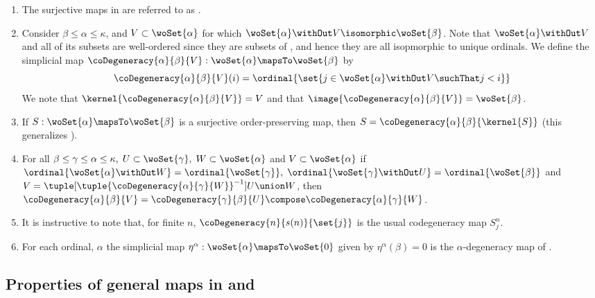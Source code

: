 \begin{enumerate}
\item The surjective maps in \DeltaC{}{} are referred to as .

\item Consider $\beta \leq \alpha \leq \kappa$, and $V \subset \woSet{\alpha}$ for which
$\woSet{\alpha} \withOut V \isomorphic \woSet{\beta}$. Note that $\woSet{\alpha}\withOut
V$ and all of its subsets are well-ordered since they are subsets of \woSet{\alpha}, and
hence they are all isopmorphic to unique ordinals. We define the simplicial map
$\coDegeneracy{\alpha}{\beta}{V} : \woSet{\alpha} \mapsTo \woSet{\beta}$ by
	\begin{equation*}
		\coDegeneracy{\alpha}{\beta}{V}(i) = \ordinal{\set{ j \in \woSet{\alpha}\withOut V
		\suchThat j < i}}
	\end{equation*}
We note that $\kernel{\coDegeneracy{\alpha}{\beta}{V}} = V$ and that
$\image{\coDegeneracy{\alpha}{\beta}{V}} = \woSet{\beta}$.

\item\label{property:unique.codegeneracy} If $S : \woSet{\alpha} \mapsTo \woSet{\beta}$ is
a surjective order-preserving map, then $S = \coDegeneracy{\alpha}{\beta}{\kernel{S}}$
(this generalizes \cite[page 4]{may1967simplicialObjectsInAlgTopo}).

\item For all $\beta \leq \gamma \leq \alpha \leq \kappa, \; U \subset \woSet{\gamma}, \;
W \subset \woSet{\alpha}$ and $V \subset \woSet{\alpha}$ if $\ordinal{\woSet{\alpha}
\withOut W} = \ordinal{\woSet{\gamma}}, \; \ordinal{\woSet{\gamma} \withOut U} =
\ordinal{\woSet{\beta}}$ and $V = \tuple[\tuple{\coDegeneracy{\alpha}{\gamma}{W}}^{-1}]{U}
\union W$, then $\coDegeneracy{\alpha}{\beta}{V} = \coDegeneracy{\gamma}{\beta}{U}
\compose \coDegeneracy{\alpha}{\gamma}{W}$.

\item It is instructive to note that, for finite $n$, $\coDegeneracy{n}{s(n)}{\set{j}}$ is
the usual codegeneracy map $S^n_j$.

\item For each ordinal, $\alpha$ the simplicial map $\eta^{\alpha} : \woSet{\alpha}
\mapsTo \woSet{0}$ given by $\eta^{\alpha}(\beta) = 0$ is the $\alpha$-degeneracy map of
\woSet{\alpha}.
\end{enumerate}

\subsection{Properties of general maps in \texorpdfstring{\DeltaC{}{}}{Delta} and
\texorpdfstring{\ndDeltaC{}{}}{ndDelta}}

